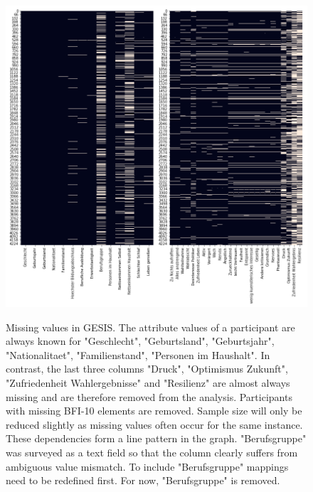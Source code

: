 \begin{figure}[h]
	\begin{center}
		\captionsetup{width= 400pt}
		\includegraphics[scale=0.50,angle=0]{fig/gesis_missing}
		\label{gesis_miss}
		\caption{Missing values in GESIS. The attribute values of a participant are always known for "Geschlecht", "Geburtsland", "Geburtsjahr", "Nationalitaet", "Familienstand", "Personen im Haushalt". In contrast, the last three columns "Druck", "Optimismus Zukunft", "Zufriedenheit Wahlergebnisse" and "Resilienz" are almost always missing and are therefore removed from the analysis. Participants with missing BFI-10 elements are removed. Sample size will only be reduced slightly as missing values often occur for the same instance. These dependencies form a line pattern in the graph. "Berufsgruppe" was surveyed as a text field so that the column clearly suffers from ambiguous value mismatch. To include "Berufsgruppe" mappings need to be redefined first. For now, "Berufsgruppe" is removed. }
	\end{center}
\end{figure}

